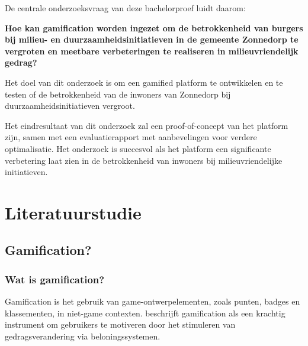 \documentclass{hogent-article}
\begin{document}
De centrale onderzoeksvraag van deze bachelorproef luidt daarom: 

\textbf{Hoe kan gamification worden ingezet om de betrokkenheid van burgers bij milieu- en duurzaamheidsinitiatieven in de gemeente Zonnedorp te vergroten en meetbare verbeteringen te realiseren in milieuvriendelijk gedrag?}

Het doel van dit onderzoek is om een gamified platform te ontwikkelen en te testen of de betrokkenheid van de inwoners van Zonnedorp bij duurzaamheidsinitiatieven vergroot.

Het eindresultaat van dit onderzoek zal een proof-of-concept van het platform zijn, samen met een evaluatierapport met aanbevelingen voor verdere optimalisatie. Het onderzoek is succesvol als het platform een significante verbetering laat zien in de betrokkenheid van inwoners bij milieuvriendelijke initiatieven.

\section{Literatuurstudie}%
\label{sec:literatuurstudie}
\subsection{Gamification?}
\subsubsection{Wat is gamification?}
Gamification is het gebruik van game-ontwerpelementen, zoals punten, badges en klassementen, in niet-game contexten. \autocite{Deterding2011} \textcite{Burke2016} beschrijft gamification als een krachtig instrument om gebruikers te motiveren door het stimuleren van gedragsverandering via beloningssystemen.
\end{document}
